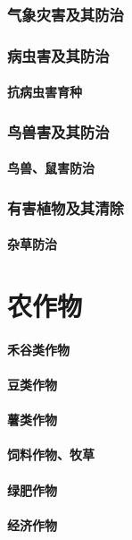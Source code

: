 \documentclass[UTF8]{../ApplicationUniverse}
\begin{document}
    \subsection{气象灾害及其防治}
    \subsection{病虫害及其防治}
        \subsubsection{抗病虫害育种}

    \subsection{鸟兽害及其防治}
        \subsubsection{鸟兽、鼠害防治}
    \subsection{有害植物及其清除}
        \subsubsection{杂草防治}



\chapter{农作物}
\subsubsection{禾谷类作物}
\subsubsection{豆类作物}
\subsubsection{薯类作物}
\subsubsection{饲料作物、牧草}
\subsubsection{绿肥作物}
\subsubsection{经济作物}
\end{document}
